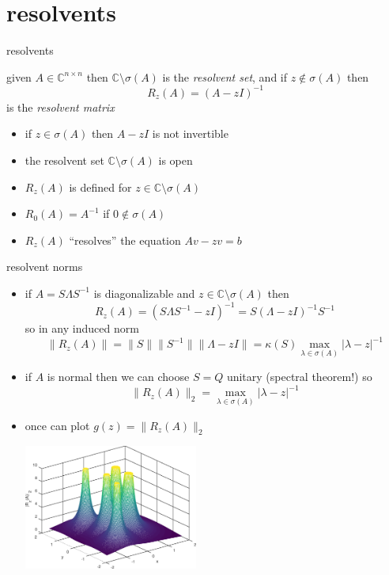 \documentclass[10pt,hyperref]{beamer}
\newcommand{\CC}{\mathbb{C}}
\begin{document}
\section{resolvents}

\begin{frame}{resolvents}

\begin{definition}
given $A\in\CC^{n\times n}$ then $\CC\setminus \sigma(A)$ is the \emph{resolvent set}, and if $z \notin \sigma(A)$ then
    $$R_z(A) = \left(A-z I\right)^{-1}$$
is the \emph{resolvent matrix}
\end{definition}

\begin{itemize}
\item if $z \in \sigma(A)$ then $A-z I$ is not invertible
\item the resolvent set $\CC\setminus \sigma(A)$ is open
\item $R_z(A)$ is defined for $z \in \CC\setminus \sigma(A)$
\item $R_0(A)=A^{-1}$ if $0\notin\sigma(A)$
\item $R_z(A)$ ``resolves'' the equation $Av-z v=b$
\end{itemize}
\end{frame}


\begin{frame}{resolvent norms}

\begin{itemize}
\item if $A=S\Lambda S^{-1}$ is diagonalizable and $z\in \CC\setminus \sigma(A)$ then
    $$R_z(A) = \left(S\Lambda S^{-1}-z I\right)^{-1} = S \left(\Lambda - z I\right)^{-1} S^{-1}$$
so in any induced norm
    $$\|R_z(A)\| = \|S\|\|S^{-1}\|\|\Lambda - z I\| = \kappa(S) \max_{\lambda\in\sigma(A)} |\lambda-z|^{-1}$$
\item if $A$ is normal then we can choose $S=Q$ unitary (spectral theorem!) so
    $$\|R_z(A)\|_2 = \max_{\lambda\in\sigma(A)} |\lambda-z|^{-1}$$
\item once can plot $g(z)=\|R_z(A)\|_2$

\vspace{-5mm}
\hfill \includegraphics[width=0.45\textwidth]{figs/resolvesurf}
\end{itemize}
\end{frame}
\end{document}
